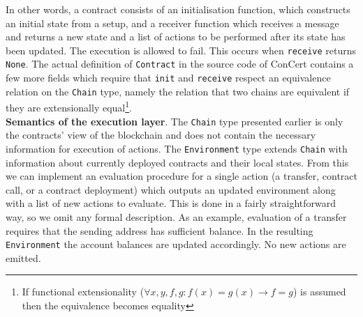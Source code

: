 \documentclass[twoside,11pt,openright]{report}
\newcommand{\cc}{ConCert}
\newcommand{\coq}[1]{\texttt{#1}}
\begin{document}
In other words, a contract consists of an initialisation function, which constructs an initial state from a setup, and a receiver function which receives a message and returns a new state and a list of actions to be performed after its state has been updated. The execution is allowed to fail. This occurs when \coq{receive} returns \coq{None}. The actual definition of \coq{Contract} in the source code of \cc{} contains a few more fields which require that \coq{init} and \coq{receive} respect an equivalence relation on the \coq{Chain} type, namely the relation that two chains are equivalent if they are extensionally equal\footnote{If functional extensionality ($\forall x, y, f, g: f(x) = g(x) \rightarrow f = g$) is assumed then the equivalence becomes equality}.
\medskip\\
\textbf{Semantics of the execution layer}. 
The \coq{Chain} type presented earlier is only the contracts' view of the blockchain and does not contain the necessary information for execution of actions. The \coq{Environment} type extends \coq{Chain} with information about currently deployed contracts and their local states. From this we can implement an evaluation procedure for a single action (a transfer, contract call, or a contract deployment) which outputs an updated environment along with a list of new actions to evaluate. This is done in a fairly straightforward way, so we omit any formal description. As an example, evaluation of a transfer requires that the sending address has sufficient balance. In the resulting \coq{Environment} the account balances are updated accordingly. No new actions are emitted.
\newcommand{\evalto}{\mathrel{\Downarrow}}
\newcommand{\eval}[4]{\langle #1, #2 \rangle \evalto (#3, #4)}
\newcommand{\stepto}{\rightarrow}
\newcommand{\step}[2]{#1 \stepto #2}
\newcommand{\reachto}{\mathrel{\rightarrow^*}}
\newcommand{\reachable}[2]{#1 \reachto #2}
\newcommand{\traceto}[1][\pi]{\xrightarrow{#1}\mathrel{\vphantom{\to}^*}}
\newcommand{\trace}[3][\pi]{#2 \traceto[#1] #3}
\newcommand{\nil}{\texttt{[]}}
\newcommand{\cons}{\mathbin{::}}
\newcommand{\app}{\mathbin{++}}
\newcommand{\Perm}{\text{Perm}}
\end{document}
